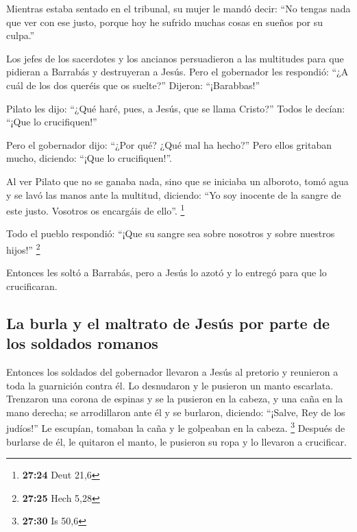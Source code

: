 \begin{paracol}{2}
 Mientras estaba sentado en el tribunal, su mujer le
mandó decir: ``No tengas nada que ver con ese justo, porque hoy he
sufrido muchas cosas en sueños por su culpa.''

 Los jefes de los sacerdotes y los ancianos persuadieron
a las multitudes para que pidieran a Barrabás y destruyeran a Jesús.
 Pero el gobernador les respondió: ``¿A cuál de los dos
queréis que os suelte?'' Dijeron: ``¡Barabbas!''

 Pilato les dijo: ``¿Qué haré, pues, a Jesús, que se
llama Cristo?'' Todos le decían: ``¡Que lo crucifiquen!''

 Pero el gobernador dijo: ``¿Por qué? ¿Qué mal ha
hecho?'' Pero ellos gritaban mucho, diciendo: ``¡Que lo crucifiquen!''.

 Al ver Pilato que no se ganaba nada, sino que se
iniciaba un alboroto, tomó agua y se lavó las manos ante la multitud,
diciendo: ``Yo soy inocente de la sangre de este justo. Vosotros os
encargáis de ello''. \footnote{\textbf{27:24} Deut 21,6}

 Todo el pueblo respondió: ``¡Que su sangre sea sobre
nosotros y sobre nuestros hijos!'' \footnote{\textbf{27:25} Hech 5,28}

 Entonces les soltó a Barrabás, pero a Jesús lo azotó y
lo entregó para que lo crucificaran.

\hypertarget{la-burla-y-el-maltrato-de-jesuxfas-por-parte-de-los-soldados-romanos}{%
\subsection{La burla y el maltrato de Jesús por parte de los soldados
romanos}\label{la-burla-y-el-maltrato-de-jesuxfas-por-parte-de-los-soldados-romanos}}

 Entonces los soldados del gobernador llevaron a Jesús al
pretorio y reunieron a toda la guarnición contra él.  Lo
desnudaron y le pusieron un manto escarlata.  Trenzaron
una corona de espinas y se la pusieron en la cabeza, y una caña en la
mano derecha; se arrodillaron ante él y se burlaron, diciendo: ``¡Salve,
Rey de los judíos!''  Le escupían, tomaban la caña y le
golpeaban en la cabeza. \footnote{\textbf{27:30} Is 50,6}
 Después de burlarse de él, le quitaron el manto, le
pusieron su ropa y lo llevaron a crucificar.

\hypertarget{el-curso-de-la-muerte-de-jesuxfas-despuuxe9s-del-guxf3lgota-su-crucifixiuxf3n-y-su-muerte}{%
}
\end{paracol}
